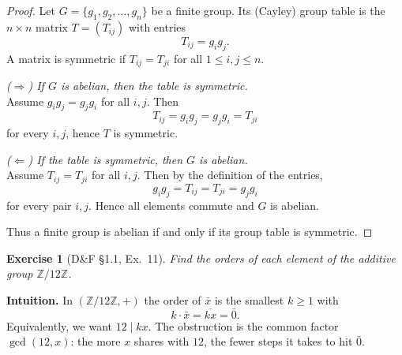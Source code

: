 \documentclass[12pt]{article}
\newtheorem{exercise}[theorem]{Exercise}
\theoremstyle{definition}
\begin{document}
\begin{proof}
Let $G=\{g_1,g_2,\dots,g_n\}$ be a finite group. Its (Cayley) group table is the $n\times n$ matrix
$T=(T_{ij})$ with entries
\[
T_{ij}=g_i g_j.
\]
A matrix is symmetric if $T_{ij}=T_{ji}$ for all $1\le i,j\le n$.

\dotfill

\noindent\emph{($\Rightarrow$) If $G$ is abelian, then the table is symmetric.}\\

\noindent
Assume $g_i g_j=g_j g_i$ for all $i,j$. Then
\[
T_{ij}=g_i g_j=g_j g_i=T_{ji}
\]
for every $i,j$, hence $T$ is symmetric.

\dotfill

\noindent\emph{($\Leftarrow$) If the table is symmetric, then $G$ is abelian.}\\

\noindent
Assume $T_{ij}=T_{ji}$ for all $i,j$. Then by the definition of the entries,
\[
g_i g_j=T_{ij}=T_{ji}=g_j g_i
\]
for every pair $i,j$. Hence all elements commute and $G$ is abelian.

\dotfill

\noindent
Thus a finite group is abelian if and only if its group table is symmetric.
\end{proof}

\newpage

\begin{exercise}[D\&F §1.1, Ex.~11]
Find the orders of each element of the additive group $\mathbb{Z}/12\mathbb{Z}$.
\end{exercise}

\dotfill

\noindent
\textbf{Intuition.}
In $(\mathbb{Z}/12\mathbb{Z},+)$ the order of $\bar x$ is the smallest $k\ge 1$ with
\[
k\cdot \bar x=\overline{kx}=\bar 0.
\]
Equivalently, we want $12\mid kx$. The obstruction is the common factor $\gcd(12,x)$:
the more $x$ shares with $12$, the fewer steps it takes to hit $\bar 0$.

\dotfill
\end{document}
